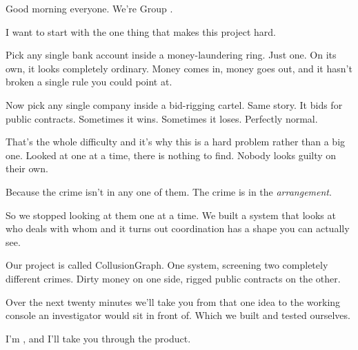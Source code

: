 \documentclass[11pt]{article}
\begin{document}
\begin{saythis}
Good morning everyone. We're Group \blank.

I want to start with the one thing that makes this project hard.

Pick any single bank account inside a money-laundering ring. Just one. On its
own, it looks completely ordinary. Money comes in, money goes out, and it
hasn't broken a single rule you could point at.

Now pick any single company inside a bid-rigging cartel. Same story. It bids
for public contracts. Sometimes it wins. Sometimes it loses. Perfectly normal.

That's the whole difficulty \bt and it's why this is a hard problem rather than
a big one. Looked at one at a time, there is nothing to find. Nobody looks
guilty on their own.

Because the crime isn't in any one of them. The crime is in the
\emph{arrangement}.

So we stopped looking at them one at a time. We built a system that looks at
who deals with whom \bt and it turns out coordination has a shape you can
actually see.

Our project is called CollusionGraph. One system, screening two completely
different crimes. Dirty money on one side, rigged public contracts on the
other.

Over the next twenty minutes we'll take you from that one idea \bt to the
working console an investigator would sit in front of. Which we built and
tested ourselves.

I'm \blank, and I'll take you through the product.
\end{saythis}
\end{document}
